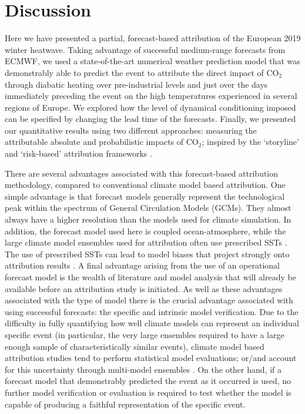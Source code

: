 \section{Discussion}\label{ch3:discussion}

  Here we have presented a partial, forecast-based attribution of the European 2019 winter heatwave. Taking advantage of successful medium-range forecasts from ECMWF, we used a state-of-the-art numerical weather prediction model that was demonstrably able to predict the event to attribute the direct impact of CO$_2$ through diabatic heating over pre-industrial levels and just over the days immediately preceding the event on the high temperatures experienced in several regions of Europe. We explored how the level of dynamical conditioning imposed can be specified by changing the lead time of the forecasts. Finally, we presented our quantitative results using two different approaches: measuring the attributable absolute and probabilistic impacts of CO$_2$; inspired by the `storyline' and `risk-based' attribution frameworks \citep{stott_human_2004,shepherd_common_2016,winsberg_severe_2020,jezequel_behind_2018}.  
  
  There are several advantages associated with this forecast-based attribution methodology, compared to conventional climate model based attribution. One simple advantage is that forecast models generally represent the technological peak within the spectrum of General Circulation Models (GCMs). They almost always have a higher resolution than the models used for climate simulation. In addition, the forecast model used here is coupled ocean-atmosphere, while the large climate model ensembles used for attribution often use prescribed SSTs \citep{ciavarella_upgrade_2018}. The use of prescribed SSTs can lead to model biases that project strongly onto attribution results \citep{fischer_biased_2018}. A final advantage arising from the use of an operational forecast model is the wealth of literature and model analysis that will already be available before an attribution study is initiated. As well as these advantages associated with the type of model there is the crucial advantage associated with using successful forecasts: the specific and intrinsic model verification. Due to the difficulty in fully quantifying how well climate models can represent an individual specific event (in particular, the very large ensembles required to have a large enough sample of characteristically similar events), climate model based attribution studies tend to perform statistical model evaluations; or/and account for this uncertainty through multi-model ensembles \citep{philip_protocol_2020}. On the other hand, if a forecast model that demonstrably predicted the event as it occurred is used, no further model verification or evaluation is required to test whether the model is capable of producing a faithful representation of the specific event.
  
